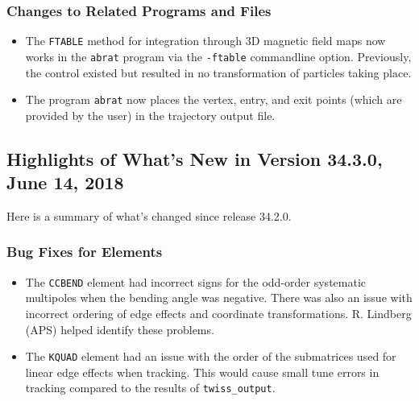 \documentclass[11pt]{article}
\begin{document}
\subsubsection{Changes to Related Programs and Files}

\begin{itemize}
\item The \verb|FTABLE| method for integration through 3D magnetic field maps now works in the \verb|abrat|
  program via the \verb|-ftable| commandline option. Previously, the control existed but resulted in no transformation
  of particles taking place.
\item The program \verb|abrat| now places the vertex, entry, and exit points (which are provided by the user)
  in the trajectory output file.
\end{itemize}


\subsection{Highlights of What's New in Version 34.3.0, June 14, 2018}

Here is a summary of what's changed since release 34.2.0.

\subsubsection{Bug Fixes for Elements}

\begin{itemize}
\item The \verb|CCBEND| element had incorrect signs for the odd-order systematic multipoles when the bending
  angle was negative. There was also an issue with incorrect ordering of edge effects and coordinate transformations.
  R. Lindberg (APS) helped identify these problems.
\item The \verb|KQUAD| element had an issue with the order of the submatrices used for linear edge effects when
  tracking. This would cause small tune errors in tracking compared to the results of \verb|twiss_output|.
\end{itemize}
\end{document}
